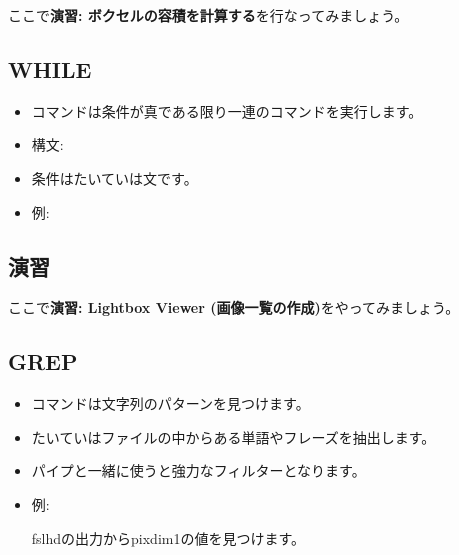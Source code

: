 \documentclass{jsarticle}
\begin{document}
ここで{\bf 演習: ボクセルの容積を計算する}を行なってみましょう。




\subsection{WHILE}


\begin{itemize}

\item {\color{red}}コマンドは条件が真である限り一連のコマンドを実行します。
\item 構文:

{\color{red}{\tt
while 条件; do

　　コマンド;

done 
}}

\bigskip

\item 条件はたいていは{\color{red}}文です。
\item 例:

{\color{red}{\tt
a=1

while [ \$a -lt 4 ] ; do

　　bet im\$a brain\$a ;

　　a=`echo \$a + 1 | bc` ;

done 
}}

\end{itemize}




\subsection*{演習}

ここで{\bf 演習: Lightbox Viewer (画像一覧の作成)}をやってみましょう。



\subsection{GREP}


\begin{itemize}

\item {\color{red}}コマンドは文字列のパターンを見つけます。
\item たいていはファイルの中からある単語やフレーズを抽出します。
\item パイプと一緒に使うと強力なフィルターとなります。
\item 例:

fslhdの出力からpixdim1の値を見つけます。

{\color{red}}

\end{itemize}
\end{document}
